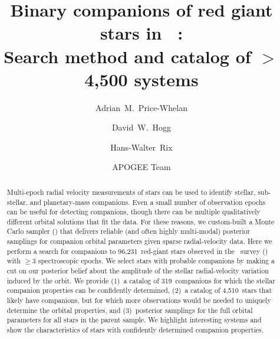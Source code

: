 \documentclass[modern, letterpaper]{aastex62}
\newcommand{\apogee}{\project{\acronym{APOGEE}}}
\newcommand{\thejoker}{\project{The~Joker}}
\newcommand{\DR}{\acronym{DR14}}
\newcommand{\nstars}{96,231}
\newcommand{\nhighK}{4,510}
\newcommand{\nunimodal}{319}
\begin{document}
\sloppy\sloppypar\raggedbottom\frenchspacing %

\title{Binary companions of red giant stars in \apogee\ \DR: \\
       Search method and catalog of $>$4,500 systems}

\author[0000-0003-0872-7098]{Adrian~M.~Price-Whelan}

\author[0000-0003-2866-9403]{David~W.~Hogg}

\author[0000-0003-4996-9069]{Hans-Walter~Rix}

\author{APOGEE Team}

\begin{abstract}\noindent %
Multi-epoch radial velocity measurements of stars can be used to identify
stellar, sub-stellar, and planetary-mass companions.
Even a small number of observation epochs can be useful for detecting
companions, though there can be multiple qualitatively different orbital
solutions that fit the data.
For these reasons, we custom-built a Monte Carlo sampler (\thejoker) that
delivers reliable (and often highly multi-modal) posterior samplings for
companion orbital parameters given sparse radial-velocity data.
Here we perform a search for companions to \nstars\ red-giant stars observed in
the \apogee\ survey (\DR) with $\geq 3$ spectroscopic epochs.
We select stars with probable companions by making a cut on our posterior belief
about the amplitude of the stellar radial-velocity variation induced by the
orbit.
We provide (1)~a catalog of \nunimodal\ companions for which the stellar
companion properties can be confidently determined, (2)~a catalog of \nhighK\
stars that likely have companions, but for which more observations would be
needed to uniquely determine the orbital properties, and (3)~posterior samplings
for the full orbital parameters for all stars in the parent sample.
We highlight interesting systems and show the characteristics of stars with
confidently determined companion properties.
\end{abstract}
\end{document}
